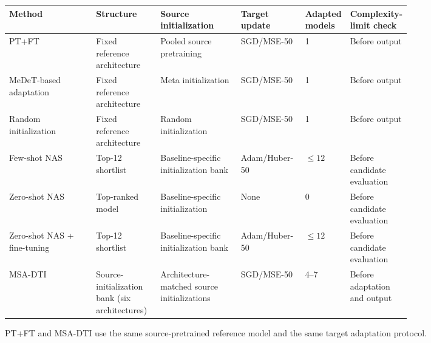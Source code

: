 \begin{center}
\begin{minipage}{\linewidth}
\label{tab:fairness}
\centering
\scriptsize
\renewcommand{\arraystretch}{1.08}
\setlength{\tabcolsep}{1.8pt}
\begin{tabularx}{\linewidth}
{Y Z{0.16\linewidth} Z{0.20\linewidth} Z{0.16\linewidth}
 Z{0.10\linewidth} Z{0.15\linewidth}}
\toprule
Method
& Structure
& Source initialization
& Target update
& Adapted models
& Complexity-limit check \\
\midrule
PT+FT
& Fixed reference architecture
& Pooled source pretraining
& SGD/MSE-50
& 1
& Before output \\

MeDeT-based adaptation
& Fixed reference architecture
& Meta initialization
& SGD/MSE-50
& 1
& Before output \\

Random initialization
& Fixed reference architecture
& Random initialization
& SGD/MSE-50
& 1
& Before output \\

Few-shot NAS
& Top-12 shortlist
& Baseline-specific initialization bank
& Adam/Huber-50
& $\leq 12$
& Before candidate evaluation \\

Zero-shot NAS
& Top-ranked model
& Baseline-specific initialization
& None
& 0
& Before candidate evaluation \\

Zero-shot NAS + fine-tuning
& Top-12 shortlist
& Baseline-specific initialization bank
& Adam/Huber-50
& $\leq 12$
& Before candidate evaluation \\

MSA-DTI
& Source-initialization bank (six architectures)
& Architecture-matched source initializations
& SGD/MSE-50
& 4--7
& Before adaptation and output \\
\bottomrule
\end{tabularx}
\vspace{2pt}
\footnotesize
PT+FT and MSA-DTI use the same source-pretrained reference model and the same
target adaptation protocol.
\end{minipage}
\end{center}
